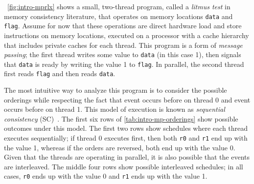 \myfiglong~\ref{fig:intro-mprlx} shows a small, two-thread program, called a \textit{litmus test} in memory consistency literature, that operates on memory locations \texttt{data} and \texttt{flag}. Assume for now that these operations are direct hardware load and store instructions on memory locations, executed on a processor with a cache hierarchy that includes private caches for each thread. This program is a form of \textit{message passing}; the first thread writes some value to \texttt{data} (in this case 1), then signals that \texttt{data} is ready by writing the value 1 to \texttt{flag}. In parallel, the second thread first reads \texttt{flag} and then reads \texttt{data}.

The most intuitive way to analyze this program is to consider the possible orderings while respecting the fact that event \introMpEventA occurs before \introMpEventB on thread 0 and event \introMpEventC occurs before \introMpEventD on thread 1. This model of execution is known as \textit{sequential consistency} (SC)~\cite{lamport1979multiprocessor}. The first six rows of \mytab\ref{tab:intro-mp-orderings} show possible outcomes under this model. The first two rows show schedules where each thread executes sequentially; if thread 0 executes first, then both \texttt{r0} and \texttt{r1} end up with the value 1, whereas if the orders are reversed, both end up with the value 0. Given that the threads are operating in parallel, it is also possible that the events are interleaved. The middle four rows show possible interleaved schedules; in all cases, \texttt{r0} ends up with the value 0 and \texttt{r1} ends up with the value 1.

